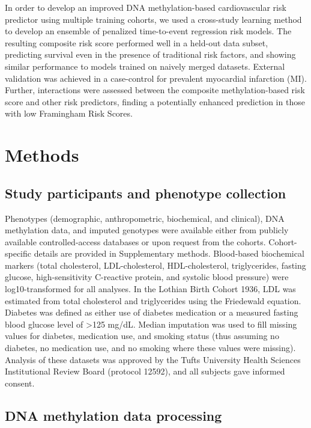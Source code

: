 \documentclass[]{article}
\begin{document}
In order to develop an improved DNA methylation-based cardiovascular
risk predictor using multiple training cohorts, we used a cross-study
learning method to develop an ensemble of penalized time-to-event
regression risk models. The resulting composite risk score performed
well in a held-out data subset, predicting survival even in the presence
of traditional risk factors, and showing similar performance to models
trained on naively merged datasets. External validation was achieved in
a case-control for prevalent myocardial infarction (MI). Further,
interactions were assessed between the composite methylation-based risk
score and other risk predictors, finding a potentially enhanced
prediction in those with low Framingham Risk Scores.

\hypertarget{methods}{%
\section{Methods}\label{methods}}

\hypertarget{study-participants-and-phenotype-collection}{%
\subsection{Study participants and phenotype
collection}\label{study-participants-and-phenotype-collection}}

Phenotypes (demographic, anthropometric, biochemical, and clinical), DNA
methylation data, and imputed genotypes were available either from
publicly available controlled-access databases or upon request from the
cohorts. Cohort-specific details are provided in Supplementary methods.
Blood-based biochemical markers (total cholesterol, LDL-cholesterol,
HDL-cholesterol, triglycerides, fasting glucose, high-sensitivity
C-reactive protein, and systolic blood pressure) were log10-transformed
for all analyses. In the Lothian Birth Cohort 1936, LDL was estimated
from total cholesterol and triglycerides using the Friedewald equation.
Diabetes was defined as either use of diabetes medication or a measured
fasting blood glucose level of \textgreater{}125 mg/dL. Median
imputation was used to fill missing values for diabetes, medication use,
and smoking status (thus assuming no diabetes, no medication use, and no
smoking where these values were missing). Analysis of these datasets was
approved by the Tufts University Health Sciences Institutional Review
Board (protocol 12592), and all subjects gave informed consent.

\hypertarget{dna-methylation-data-processing}{%
\subsection{DNA methylation data
processing}\label{dna-methylation-data-processing}}
\end{document}
